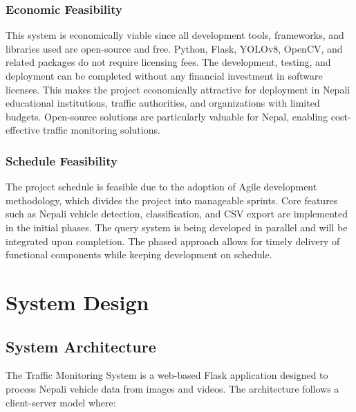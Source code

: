 \documentclass[12pt,a4paper]{report}
\begin{document}
\subsection{Economic Feasibility}
This system is economically viable since all development tools, frameworks, and libraries used are open-source and free. Python, Flask, YOLOv8, OpenCV, and related packages do not require licensing fees. The development, testing, and deployment can be completed without any financial investment in software licenses. This makes the project economically attractive for deployment in Nepali educational institutions, traffic authorities, and organizations with limited budgets. Open-source solutions are particularly valuable for Nepal, enabling cost-effective traffic monitoring solutions.

\subsection{Schedule Feasibility}
The project schedule is feasible due to the adoption of Agile development methodology, which divides the project into manageable sprints. Core features such as Nepali vehicle detection, classification, and CSV export are implemented in the initial phases. The query system is being developed in parallel and will be integrated upon completion. The phased approach allows for timely delivery of functional components while keeping development on schedule.



\chapter{System Design}

\section{System Architecture}
The Traffic Monitoring System is a web-based Flask application designed to process Nepali vehicle data from images and videos. The architecture follows a client-server model where:
\end{document}
